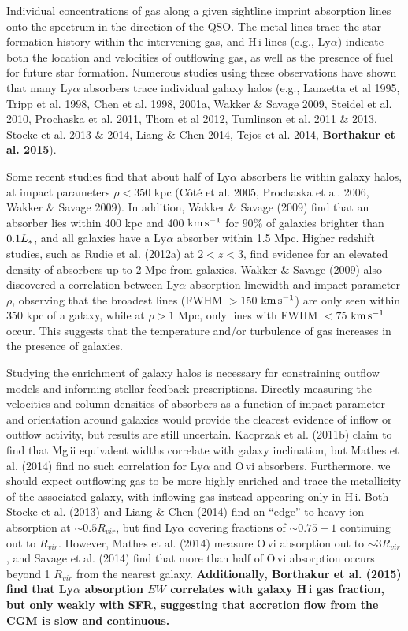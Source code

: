\documentclass[twocolumn,tighten]{aastex6}
\begin{document}
Individual concentrations of gas along a given sightline imprint absorption lines onto the spectrum in the direction of the QSO. The metal lines trace the star formation history within the intervening gas, and H\,{\sc i} lines (e.g., Ly$\alpha$) indicate both the location and velocities of outflowing gas, as well as the presence of fuel for future star formation. Numerous studies using these observations have shown that many Ly$\alpha$ absorbers trace individual galaxy halos (e.g., Lanzetta et al 1995, Tripp et al. 1998, Chen et al. 1998, 2001a, Wakker $\&$ Savage 2009, Steidel et al. 2010, Prochaska et al. 2011, Thom et al 2012, Tumlinson et al. 2011 $\&$ 2013, Stocke et al. 2013 $\&$ 2014, Liang $\&$ Chen 2014, Tejos et al. 2014, \textbf{Borthakur et al. 2015}).

Some recent studies find that about half of Ly$\alpha$ absorbers lie within galaxy halos, at impact parameters $\rho<350$ kpc (C\^{o}t\'{e} et al. 2005, Prochaska et al. 2006, Wakker $\&$ Savage 2009). In addition, Wakker $\&$ Savage (2009) find that an absorber lies within 400 kpc and 400 $\rm km\, s^{-1}$ for $90\%$ of galaxies brighter than $0.1L_{\**}$, and all galaxies have a Ly$\alpha$ absorber within 1.5 Mpc. Higher redshift studies, such as Rudie et al. (2012a) at $2<z<3$, find evidence for an elevated density of absorbers up to 2 Mpc from galaxies. Wakker $\&$ Savage (2009) also discovered a correlation between Ly$\alpha$ absorption linewidth and impact parameter $\rho$, observing that the broadest lines (FWHM $>$150 $\rm km\, s^{-1}$) are only seen within 350 kpc of a galaxy, while at $\rho>1$ Mpc, only lines with FWHM $<75$ $\rm km\, s^{-1}$ occur. This suggests that the temperature and/or turbulence of gas increases in the presence of galaxies.

Studying the enrichment of galaxy halos is necessary for constraining outflow models and informing stellar feedback prescriptions. Directly measuring the velocities and column densities of absorbers as a function of impact parameter and orientation around galaxies would provide the clearest evidence of inflow or outflow activity, but results are still uncertain. Kacprzak et al. (2011b) claim to find that Mg\,{\sc ii} equivalent widths correlate with galaxy inclination, but Mathes et al. (2014) find no such correlation for Ly$\alpha$ and O\,{\sc vi} absorbers. Furthermore, we should expect outflowing gas to be more highly enriched and trace the metallicity of the associated galaxy, with inflowing gas instead appearing only in H\,{\sc i}. Both Stocke et al. (2013) and Liang $\&$ Chen (2014) find an ``edge'' to heavy ion absorption at $\sim0.5R_{vir}$, but find Ly$\alpha$ covering fractions of $\sim0.75-1$ continuing out to $R_{vir}$. However, Mathes et al. (2014) measure O\,{\sc vi} absorption out to $\sim3 R_{vir}$, and Savage et al. (2014) find that more than half of O\,{\sc vi} absorption occurs beyond 1 $R_{vir}$ from the nearest galaxy. \textbf{Additionally, Borthakur et al. (2015) find that Ly$\alpha$ absorption $EW$ correlates with galaxy H\,{\sc i} gas fraction, but only weakly with SFR, suggesting that accretion flow from the CGM is slow and continuous.}
\end{document}
